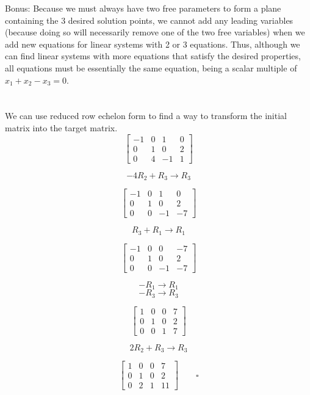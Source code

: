 \documentclass[12pt]{amsart}
\begin{document}
Bonus: Because we must always have two free parameters to form a plane containing the 3 desired solution points, we cannot add any leading variables (because doing so will necessarily remove one of the two free variables) when we add new equations for linear systems with 2 or 3 equations. Thus, although we can find linear systems with more equations that satisfy the desired properties, all equations must be essentially the same equation, being
a scalar multiple of $x_1 + x_2 - x_3 = 0$.
\newpage
\section{}
We can use reduced row echelon form to find a way to transform the initial matrix into the target matrix.
$$
\begin{bmatrix}
    -1 & 0 & 1 & 0 \\
    0 & 1 & 0 & 2 \\
    0 & 4 & -1 & 1
\end{bmatrix}
$$

$$-4R_2 +R_3\to R_3$$

$$
\begin{bmatrix}
    -1 & 0 & 1 & 0 \\
    0 & 1 & 0 & 2 \\
    0 & 0 & -1 & -7
\end{bmatrix}
$$

$$R_3 + R_1 \to R_1$$

$$
\begin{bmatrix}
    -1 & 0 & 0 & -7 \\
    0 & 1 & 0 & 2 \\
    0 & 0 & -1 & -7
\end{bmatrix}
$$

$$-R_1 \to R_1$$
$$-R_3 \to R_3$$

$$
\begin{bmatrix}
    1 & 0 & 0 & 7 \\
    0 & 1 & 0 & 2 \\
    0 & 0 & 1 & 7
\end{bmatrix}
$$

$$2R_2 + R_3 \to R_3$$

$$
\begin{bmatrix}
    1 & 0 & 0 & 7 \\
    0 & 1 & 0 & 2 \\
    0 & 2 & 1 & 11
\end{bmatrix} \qquad \square
$$
\end{document}
